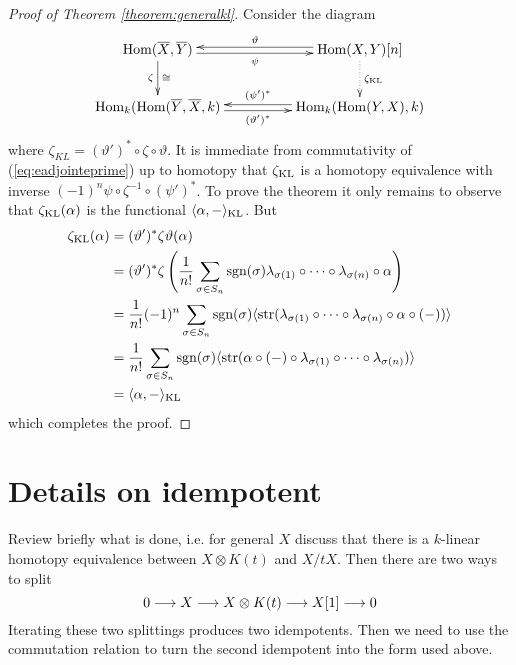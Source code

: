 \documentclass{compositio}
\theoremstyle{definition}
\numberwithin{equation}{section}
\def\Hom{\operatorname{Hom}}
\DeclareMathOperator{\str}{str}
\begin{document}
\begin{proof}[Proof of Theorem \ref{theorem:generalkl}] Consider the diagram
\[
\xymatrix@C+2pc{
\Hom(\overline{X},\overline{Y}) \ar[d]_-{\zeta}^-{\cong} \ar@<-0.5ex>[r]_-{\psi} & \Hom(X,Y)[n] \ar@<-0.5ex>[l]_-{\vartheta} \ar@{.>}[d]^{\zeta_{\textup{KL}}}\\
\Hom_k(\Hom(\overline{Y}, \overline{X},k) \ar@<-0.5ex>[r]_-{(\vartheta')^*} & \Hom_k( \Hom(Y,X), k) \ar@<-0.5ex>[l]_-{(\psi')^*}
}
\]
where $\zeta_{KL} = (\vartheta')^* \circ \zeta \circ \vartheta$. It is immediate from commutativity of (\ref{eq:eadjointeprime}) up to homotopy that $\zeta_{\textup{KL}}$ is a homotopy equivalence with inverse $(-1)^n \psi \circ \zeta^{-1} \circ (\psi')^*$. To prove the theorem it only remains to observe that $\zeta_{\textup{KL}}(\alpha)$ is the functional $\langle \alpha, - \rangle_{\textup{KL}}$. But
\begin{align*}
\zeta_{\textup{KL}}(\alpha) &= (\vartheta')^* \zeta \vartheta( \alpha )\\
&= (\vartheta')^* \zeta\left( \frac{1}{n!} \sum_{\sigma \in S_n} \textup{sgn}(\sigma) \lambda_{\sigma(1)} \circ \cdots \circ \lambda_{\sigma(n)} \circ \alpha \right)\\
&= \frac{1}{n!} (-1)^n \sum_{\sigma \in S_n} \textup{sgn}(\sigma) \langle \str( \lambda_{\sigma(1)} \circ \cdots \circ \lambda_{\sigma(n)} \circ \alpha \circ (-) ) \rangle\\
&= \frac{1}{n!} \sum_{\sigma \in S_n} \textup{sgn}(\sigma) \langle \str(  \alpha \circ (-) \circ \lambda_{\sigma(1)} \circ \cdots \circ \lambda_{\sigma(n)} ) \rangle\\
&= \langle \alpha, - \rangle_{\textup{KL}}
\end{align*}
which completes the proof.
\end{proof}

\section{Details on idempotent}

Review briefly what is done, i.e. for general $X$ discuss that there is a $k$-linear homotopy equivalence between $X \otimes K(t)$ and $X/tX$. Then there are two ways to split
\[
0 \longrightarrow X \longrightarrow X \otimes K(t) \longrightarrow X[1] \longrightarrow 0
\]
Iterating these two splittings produces two idempotents. Then we need to use the commutation relation to turn the second idempotent into the form used above.

\newpage
\end{document}
